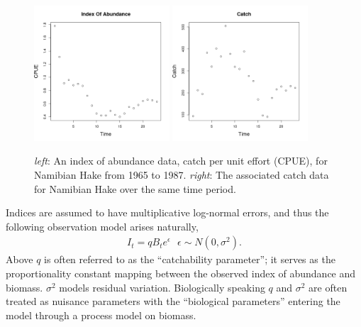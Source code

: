 \documentclass[12pt]{ucscthesis}
\begin{document}
{%
\begin{figure}[h!]
        \includegraphics[width=0.45\textwidth]{./plots/hakeIndex.png}
        \includegraphics[width=0.45\textwidth]{./plots/hakeCatch.png}
        \caption{\label{hakeData}
        \textit{left}: An index of abundance data, catch per unit effort (CPUE), for Namibian Hake from 1965 to 1987. %
        \textit{right}: The associated catch data for Namibian Hake over the same time period.
        }
\end{figure}

Indices are assumed to have multiplicative log-normal errors, and thus
the following observation model arises naturally,
\begin{align}
I_t = q B_t e^\epsilon ~~~ \epsilon\sim N(0, \sigma^2).
\end{align}
%
Above $q$ is often referred to as the ``catchability parameter''; it serves as the %
proportionality constant mapping between the observed index of abundance and biomass.
$\sigma^2$ models residual variation. Biologically speaking $q$ and $\sigma^2$
are often treated as nuisance parameters with the ``biological parameters''
entering the model through a process model on biomass.

}
\end{document}
